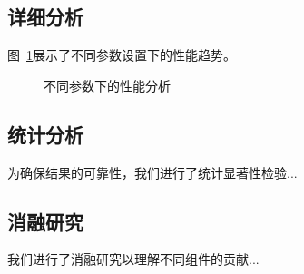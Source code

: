 \subsection{详细分析}

图~\ref{fig:performance}展示了不同参数设置下的性能趋势。

\begin{figure}[ht]
\centering
\caption{不同参数下的性能分析}
\label{fig:performance}
\end{figure}

\subsection{统计分析}

为确保结果的可靠性，我们进行了统计显著性检验...

\subsection{消融研究}

我们进行了消融研究以理解不同组件的贡献...